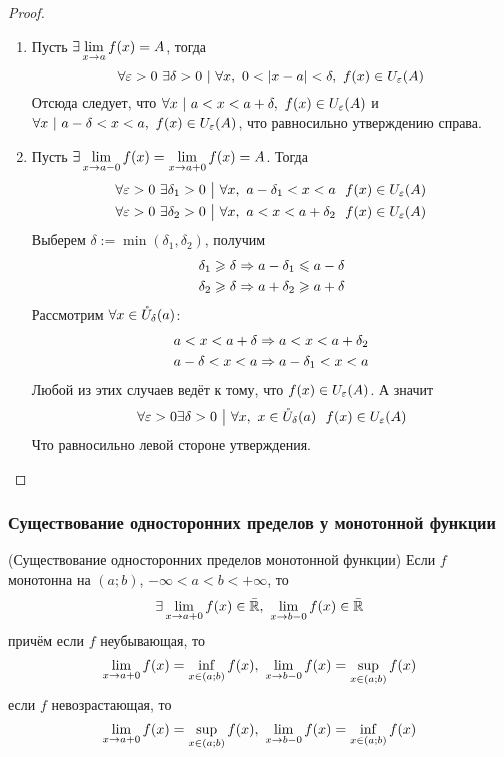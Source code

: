 \begin{proof}
\begin{enumerate}
	\item Пусть $\exists \lim\limits_{x \to a} f(x) = A$, тогда
	$$
		\forall \eps > 0\ \exists \delta > 0\ |\ \forall x,\ 0 < |x - a| < \delta,\ f(x) \in U_{\eps}(A)
	$$
	Отсюда следует, что $\forall x\ |\ a < x < a + \delta,\ f(x) \in U_{\varepsilon}(A)$ и $\forall x\ |\ a - \delta < x < a,\ f(x) \in U_{\varepsilon}(A)$, что равносильно утверждению справа.
	
	\item Пусть $\exists \lim\limits_{x \to a-0} f(x) = \lim\limits_{x \to a+0} f(x) = A$. Тогда
	\begin{align*}
		\forall \varepsilon > 0\ \exists \delta_1 > 0 \ \big|\  \forall x,\ a - \delta_1 < x < a\ \ f(x) \in U_{\varepsilon}(A)
		\\
		\forall \varepsilon > 0\ \exists \delta_2 > 0 \ \big|\  \forall x,\ a < x < a + \delta_2\ \ f(x) \in U_{\varepsilon}(A)
	\end{align*}
	Выберем $\delta := \min(\delta_1, \delta_2)$, получим
	\begin{align*}
		\delta_1 \geqslant \delta \Rightarrow a - \delta_1 \leqslant a - \delta
		\\
		\delta_2 \geqslant \delta \Rightarrow a + \delta_2 \geqslant a + \delta
	\end{align*}
	Рассмотрим $\forall x \in \mathring{U}_\delta(a)$:
	\begin{align*}
		a < x < a + \delta \Rightarrow a < x < a + \delta_2
		\\
		a - \delta < x < a \Rightarrow a - \delta_1 < x < a
	\end{align*}
	Любой из этих случаев ведёт к тому, что $f(x) \in U_{\varepsilon}(A)$. А значит
	\[
		\forall \varepsilon > 0 \exists \delta > 0 \ \big|\  \forall x,\ x \in \mathring{U}_{\delta}(a)\ \ f(x) \in U_{\varepsilon}(A)
	\]
	Что равносильно левой стороне утверждения.
\end{enumerate}

\end{proof}

\subsubsection{Существование односторонних пределов у монотонной функции}

\begin{theorem} (Существование односторонних пределов монотонной функции)
	Если $f$ монотонна на $(a; b)$, $-\infty < a < b < +\infty$, то
	$$
		\exists \lim\limits_{x \to a+0} f(x) \in \bar{\mathbb{R}},\ \lim\limits_{x \to b-0} f(x) \in \bar{\mathbb{R}}
	$$
	причём если $f$ неубывающая, то
	$$
		\lim\limits_{x \to a+0} f(x) = \inf\limits_{x \in (a; b)} f(x),\ \lim\limits_{x \to b-0} f(x) = \sup\limits_{x \in (a; b)} f(x)
	$$
	если $f$ невозрастающая, то
	$$
		\lim\limits_{x \to a+0} f(x) = \sup\limits_{x \in (a; b)} f(x),\ \lim\limits_{x \to b-0} f(x) = \inf\limits_{x \in (a; b)} f(x)
	$$
\end{theorem}

